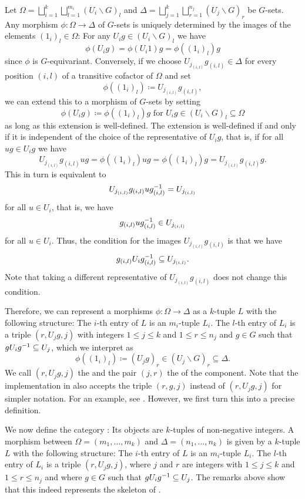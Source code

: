 \begin{rem}
Let $\Omega = \bigsqcup_{i=1}^k \bigsqcup_{l=1}^{m_i} (U_i \backslash G)_l$ and $\Delta = \bigsqcup_{j=1}^k \bigsqcup_{r=1}^{n_j} (U_j \backslash G)_r$ be $G$-sets. Any morphism $\phi \colon \Omega \to \Delta$ of $G$-sets is uniquely determined by the images of the elements $(1_i)_l \in \Omega$: For any $U_ig \in (U_i \backslash G)_l$ we have \[\phi(U_ig) = \phi(U_i1)g = \phi((1_i)_l)g\] since $\phi$ is $G$-equivariant. Conversely, if we choose $U_{j_{(i,l)}}g_{(i,l)} \in \Delta$ for every position $(i,l)$ of a transitive cofactor of $\Omega$ and set \[\phi((1_i)_l) \coloneqq U_{j_{(i,l)}}g_{(i,l)},\] we can extend this to a morphism of $G$-sets by setting \[\phi(U_ig) \coloneqq \phi((1_i)_l)g\text{ for }U_ig \in (U_i \backslash G)_l \subseteq \Omega\] as long as this extension is well-defined. The extension is well-defined if and only if it is independent of the choice of the representative of $U_ig$, that is, if for all $ug \in U_ig$ we have \[U_{j_{(i,l)}}g_{(i,l)}ug = \phi((1_i)_l)ug = \phi((1_i)_l)g = U_{j_{(i,l)}}g_{(i,l)}g.\]
This in turn is equivalent to \[U_{j_{(i,l)}}g_{(i,l)}ug_{(i,l)}^{-1} = U_{j_{(i,l)}}\] for all $u \in U_i$, that is, we have \[g_{(i,l)}ug_{(i,l)}^{-1} \in U_{j_{(i,l)}}\] for all $u \in U_i$. Thus, the condition for the images $U_{j_{(i,l)}}g_{(i,l)}$ is that we have \[g_{(i,l)}U_ig_{(i,l)}^{-1} \subseteq U_{j_{(i,l)}}.\] Note that taking a different representative of $U_{j_{(i,l)}}g_{(i,l)}$ does not change this condition.

Therefore, we can represent a morphisms $\phi\colon \Omega \to \Delta$ as a $k$-tuple $L$ with the following structure: The $i$-th entry of $L$ is an $m_i$-tuple $L_i$. The $l$-th entry of $L_i$ is a triple $(r,U_jg,j)$ with integers $1 \leq j \leq k$ and $1 \leq r \leq n_j$ and $g \in G$ such that $gU_ig^{-1} \subseteq U_j$, which we interpret as \[\phi((1_i)_l) \coloneqq (U_jg)_r \in (U_j \backslash G)_r \subseteq \Delta.\] We call $(r,U_jg,j)$ the  and the pair $(j,r)$ the  of the component. Note that the implementation in \CapPkg{} also accepts the triple $(r,g,j)$ instead of $(r,U_jg,j)$ for simpler notation. For an example, see . However, we first turn this into a precise definition.
\end{rem}

\begin{defn}
We now define the category \emphindex{\SkeletalGSets{}}: Its objects are $k$-tuples of non-negative integers. A morphism between $\Omega = (m_1,\dots,m_k)$ and $\Delta = (n_1,\dots,n_k)$ is given by a $k$-tuple $L$ with the following structure: The $i$-th entry of $L$ is an $m_i$-tuple $L_i$. The $l$-th entry of $L_i$ is a triple $(r,U_jg,j)$, where $j$ and $r$ are integers with $1 \leq j \leq k$ and $1 \leq r \leq n_j$ and where $g \in G$ such that $g U_i g^{-1} \subseteq U_j$. The remarks above show that this indeed represents the skeleton of \Gset{}.
\end{defn}

